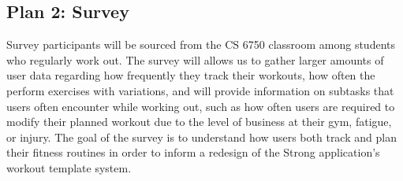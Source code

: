 \documentclass[
	letterpaper, %
]{jdf}
\begin{document}
\subsection{Plan 2: Survey}
Survey participants will be sourced from the CS 6750 classroom among students who regularly work out. The survey will allows us to gather larger amounts of user data regarding how frequently they track their workouts, how often the perform exercises with variations, and will provide information on subtasks that users often encounter while working out, such as how often users are required to modify their planned workout due to the level of business at their gym, fatigue, or injury. The goal of the survey is to understand how users both track and plan their fitness routines in order to inform a redesign of the Strong application's workout template system.
\end{document}
